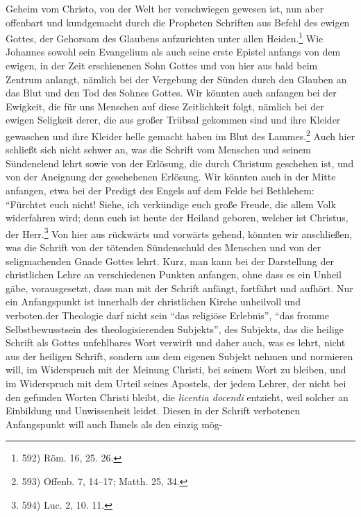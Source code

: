 Geheim vom Christo, von der Welt her verschwiegen gewesen ist, nun aber offenbart und kundgemacht durch die Propheten Schriften aus Befehl des ewigen Gottes, der Gehorsam des Glaubens aufzurichten unter allen Heiden.\footnote{592) Röm. 16, 25. 26.} Wie Johannes sowohl sein Evangelium als auch seine erste Epistel anfangs von dem ewigen, in der Zeit erschienenen Sohn Gottes und von hier aus bald beim Zentrum anlangt, nämlich bei der Vergebung der Sünden durch den Glauben an das Blut und den Tod des Sohnes Gottes. Wir könnten auch anfangen bei der Ewigkeit, die für uns Menschen auf diese Zeitlichkeit folgt, nämlich bei der ewigen Seligkeit derer, die aus großer Trübsal gekommen sind und ihre Kleider gewaschen und ihre Kleider helle gemacht haben im Blut des Lammes.\footnote{593) Offenb. 7, 14–17; Matth. 25, 34.} Auch hier schließt sich nicht schwer an, was die Schrift vom Menschen und seinem Sündenelend lehrt sowie von der Erlösung, die durch Christum geschehen ist, und von der Aneignung der geschehenen Erlösung. Wir könnten auch in der Mitte anfangen, etwa bei der Predigt des Engels auf dem Felde bei Bethlehem: \textquotedblleft Fürchtet euch nicht! Siehe, ich verkündige euch große Freude, die allem Volk widerfahren wird; denn euch ist heute der Heiland geboren, welcher ist Christus, der Herr.\footnote{594) Luc. 2, 10. 11.} Von hier aus rückwärts und vorwärts gehend, könnten wir anschließen, was die Schrift von der tötenden Sündenschuld des Menschen und von der seligmachenden Gnade Gottes lehrt. Kurz, man kann bei der Darstellung der christlichen Lehre an verschiedenen Punkten anfangen, ohne dass es ein Unheil gäbe, vorausgesetzt, dass man mit der Schrift anfängt, fortfährt und aufhört. Nur ein Anfangspunkt ist innerhalb der christlichen Kirche unheilvoll und verboten.\nAnfangspunkt der Theologie darf nicht sein \textquotedblleft das religiöse Erlebnis\textquotedblright, \textquotedblleft das fromme Selbstbewusstsein des theologisierenden Subjekts\textquotedblright, des Subjekts, das die heilige Schrift als Gottes unfehlbares Wort verwirft und daher auch, was es lehrt, nicht aus der heiligen Schrift, sondern aus dem eigenen Subjekt nehmen und normieren will, im Widerspruch mit der Meinung Christi, bei seinem Wort zu bleiben, und im Widerspruch mit dem Urteil seines Apostels, der jedem Lehrer, der nicht bei den gefunden Worten Christi bleibt, die \textit{licentia docendi} entzieht, weil solcher an Einbildung und Unwissenheit leidet. Diesen in der Schrift verbotenen Anfangspunkt will auch Ihmels als den einzig mög-